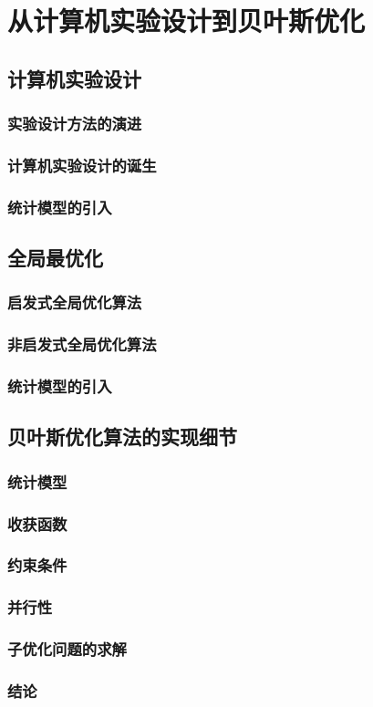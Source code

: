 \documentclass[index]{subfiles}
\begin{document}
\chapter{从计算机实验设计到贝叶斯优化}
\section{计算机实验设计}
\subsection{实验设计方法的演进}
\subsection{计算机实验设计的诞生}
\subsection{统计模型的引入}
\section{全局最优化}
\subsection{启发式全局优化算法}
\subsection{非启发式全局优化算法}
\subsection{统计模型的引入}
\section{贝叶斯优化算法的实现细节}
\subsection{统计模型}
\subsection{收获函数}
\subsection{约束条件}
\subsection{并行性}
\subsection{子优化问题的求解}
\subsection{结论}
\end{document}
